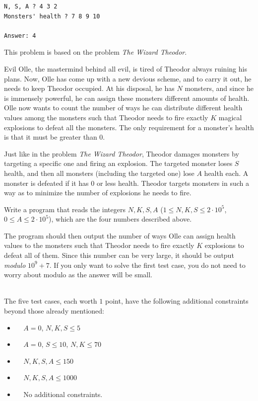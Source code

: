 \begin{verbatim}
N, S, A ? 4 3 2
Monsters' health ? 7 8 9 10

Answer: 4
\end{verbatim}





This problem is based on the problem \textit{The Wizard Theodor}.  

Evil Olle, the mastermind behind all evil, is tired of Theodor always ruining his plans. 
Now, Olle has come up with a new devious scheme, and to carry it out, he needs to keep Theodor occupied. 
At his disposal, he has $N$ monsters, and since he is immensely powerful, he can assign these monsters different amounts of health. 
Olle now wants to count the number of ways he can distribute different health values among the monsters such that 
Theodor needs to fire exactly $K$ magical explosions to defeat all the monsters. 
The only requirement for a monster's health is that it must be greater than $0$.  

Just like in the problem \textit{The Wizard Theodor}, 
Theodor damages monsters by targeting a specific one and firing an explosion. 
The targeted monster loses $S$ health, and then all monsters (including the targeted one) lose $A$ health each. 
A monster is defeated if it has $0$ or less health. Theodor targets monsters in such a way as to minimize the number of explosions he needs to fire.  

Write a program that reads the integers $N, K, S, A$ ($1 \leq N, K, S \leq 2\cdot10^5$, $0 \leq A \leq 2\cdot10^5$), which are the four numbers described above.  

The program should then output the number of ways Olle can assign health values to the 
monsters such that Theodor needs to fire exactly $K$ explosions to defeat all of them. 
Since this number can be very large, it should be output \textit{modulo} $10^9+7$. 
If you only want to solve the first test case, you do not need to worry about modulo as the answer will be small.



\\
The five test cases, each worth $1$ point, have the following additional constraints beyond those already mentioned:
\begin{itemize}
    \item[(1)] $\;\;\;\; A = 0$, $N, K, S \leq 5$
    \item[(2)] $\;\;\;\; A = 0$, $S \leq 10$, $N, K \leq 70$
    \item[(3)] $\;\;\;\; N, K, S, A \leq 150$
    \item[(4)] $\;\;\;\; N, K, S, A \leq 1000$
    \item[(5)] $\;\;\;\;$No additional constraints.
\end{itemize}


